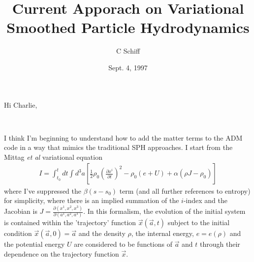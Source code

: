 \documentclass{article}
\begin{document}
\title{Current Apporach on Variational Smoothed Particle Hydrodynamics}
\author{C Schiff}
\date{Sept. 4, 1997}
\maketitle
Hi Charlie,

{}\,

I think I'm beginning to understand how to add the matter terms to the ADM code in a way that mimics the traditional SPH approaches.  I start from the Mittag \emph{et al} variational equation
\begin{eqnarray}
I = \int_{t_0}^t \! dt \int \! d^3a \left[ \frac{1}{2} \rho_0 \left( \frac{\partial x^i}{\partial t} \right)^2 - \rho_0 (e + U) + \alpha (\rho J - \rho_0) \right]
\end{eqnarray}
where I've suppressed the $\beta (s - s_{0})$ term (and all further references to entropy) for simplicity, where there is an implied summation of the $i$-index and the Jacobian is $J = \frac{\partial \left( x^1, x^2, x^3 \right)} {\partial \left( a^1, a^2, a^3 \right)}$.  In this formalism, the evolution of the initial system is contained within the 'trajectory' function ${\vec x}({\vec a},t)$ subject to the initial condition ${\vec x}({\vec a},0) = {\vec a}$ and the density $\rho$, the internal energy, $e = e(\rho)$ and the potential energy $U$ are considered to be functions of ${\vec a}$ and $t$ through their dependence on the trajectory function ${\vec x}$.
\end{document}
